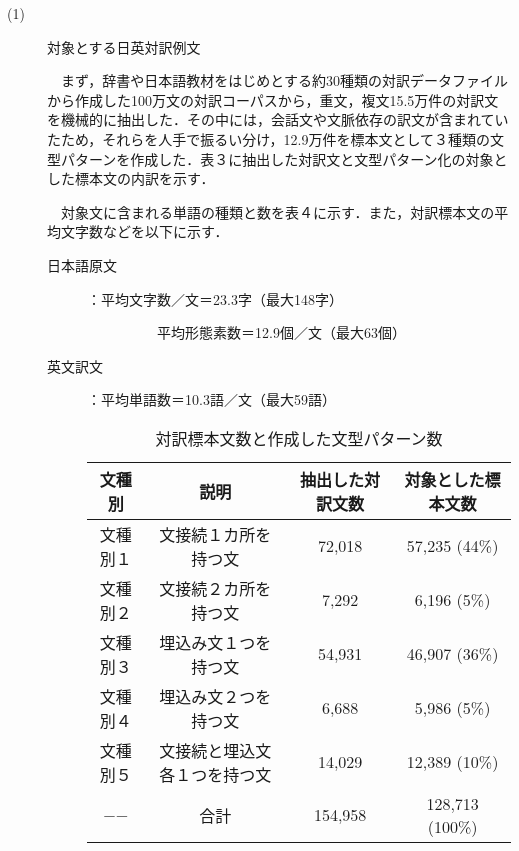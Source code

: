 \documentclass{nlp}
\begin{document}
\begin{description}
\item[(1)] 対象とする日英対訳例文

　まず，辞書や日本語教材をはじめとする約30種類の対訳データファイルから作成した100万文の対訳コーパスから，重文，複文15.5万件の対訳文を機械的に抽出した．その中には，会話文や文脈依存の訳文が含まれていたため，それらを人手で振るい分け，12.9万件を標本文として３種類の文型パターンを作成した．表３に抽出した対訳文と文型パターン化の対象とした標本文の内訳を示す．

　対象文に含まれる単語の種類と数を表４に示す．また，対訳標本文の平均文字数などを以下に示す．

\begin{description}
\item[日本語原文]：平均文字数／文＝23.3字（最大148字）

　　　　　平均形態素数＝12.9個／文（最大63個）

\item[英文訳文]：平均単語数＝10.3語／文（最大59語）

\begin{table}[!htbp]
\footnotesize
\begin{center}
\caption{対訳標本文数と作成した文型パターン数}
\begin{tabular}{|c|c|c|c|}
\hline
文種別 & 説明 & 抽出した対訳文数 & 対象とした標本文数 \\ \hline
文種別１ & 文接続１カ所を持つ文 & 72,018 & 57,235 (44\%) \\ \hline
文種別２ & 文接続２カ所を持つ文 & 7,292 & 6,196 (5\%) \\ \hline
文種別３ & 埋込み文１つを持つ文 & 54,931 & 46,907 (36\%) \\ \hline 
文種別４ & 埋込み文２つを持つ文 & 6,688 & 5,986 (5\%) \\ \hline
文種別５ & 文接続と埋込文各１つを持つ文 & 14,029 & 12,389 (10\%) \\ \hline 
−−     & 合計 & 154,958 & 128,713 (100\%) \\ \hline
\end{tabular}
\end{center}
\end{table}


\end{description}
\end{description}
\end{document}

